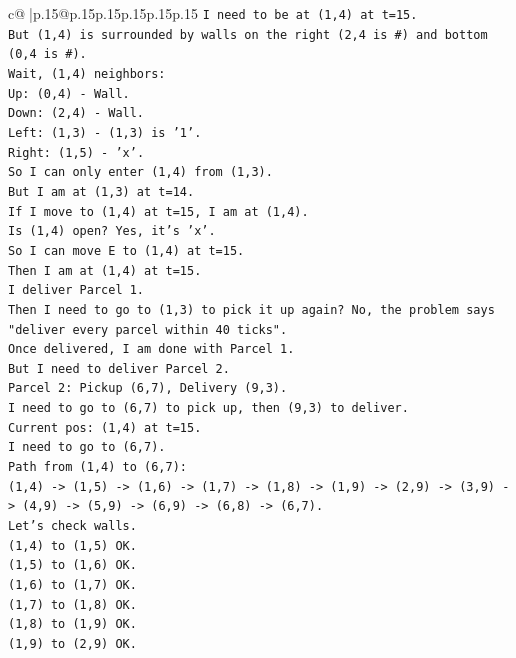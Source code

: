\documentclass{article}
\begin{document}
{\begin{supertabular}{c@{$\;$}|p{.15\linewidth}@{}p{.15\linewidth}p{.15\linewidth}p{.15\linewidth}p{.15\linewidth}p{.15\linewidth}}
{{{\texttt{I need to be at (1,4) at t=15.} \\
\texttt{But (1,4) is surrounded by walls on the right (2,4 is \#) and bottom (0,4 is \#).} \\
\texttt{Wait, (1,4) neighbors:} \\
\texttt{Up: (0,4) {-} Wall.} \\
\texttt{Down: (2,4) {-} Wall.} \\
\texttt{Left: (1,3) {-} (1,3) is '1'.} \\
\texttt{Right: (1,5) {-} 'x'.} \\
\texttt{So I can only enter (1,4) from (1,3).} \\
\texttt{But I am at (1,3) at t=14.} \\
\texttt{If I move to (1,4) at t=15, I am at (1,4).} \\
\texttt{Is (1,4) open? Yes, it's 'x'.} \\
\texttt{So I can move E to (1,4) at t=15.} \\
\texttt{Then I am at (1,4) at t=15.} \\
\texttt{I deliver Parcel 1.} \\
\texttt{Then I need to go to (1,3) to pick it up again? No, the problem says "deliver every parcel within 40 ticks".} \\
\texttt{Once delivered, I am done with Parcel 1.} \\
\texttt{But I need to deliver Parcel 2.} \\
\texttt{Parcel 2: Pickup (6,7), Delivery (9,3).} \\
\texttt{I need to go to (6,7) to pick up, then (9,3) to deliver.} \\
\texttt{Current pos: (1,4) at t=15.} \\
\texttt{I need to go to (6,7).} \\
\texttt{Path from (1,4) to (6,7):} \\
\texttt{(1,4) {-}> (1,5) {-}> (1,6) {-}> (1,7) {-}> (1,8) {-}> (1,9) {-}> (2,9) {-}> (3,9) {-}> (4,9) {-}> (5,9) {-}> (6,9) {-}> (6,8) {-}> (6,7).} \\
\texttt{Let's check walls.} \\
\texttt{(1,4) to (1,5) OK.} \\
\texttt{(1,5) to (1,6) OK.} \\
\texttt{(1,6) to (1,7) OK.} \\
\texttt{(1,7) to (1,8) OK.} \\
\texttt{(1,8) to (1,9) OK.} \\
\texttt{(1,9) to (2,9) OK.} \\
}}}
\end{supertabular}}
\end{document}
